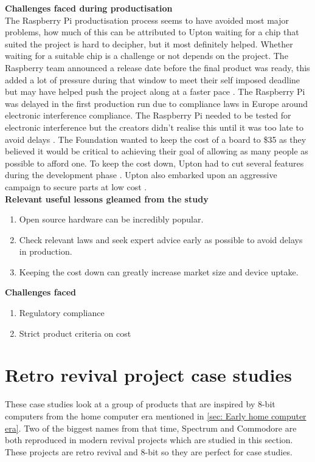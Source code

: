 \textbf{Challenges faced during productisation}\\
The Raspberry Pi productisation process seems to have avoided most major problems, how much of this can be attributed to Upton waiting for a chip that suited the project is hard to decipher, but it most definitely helped. Whether waiting for a suitable chip is a challenge or not depends on the project.
The Raspberry team announced a release date before the final product was ready, this added a lot of pressure during that window to meet their self imposed deadline but may have helped push the project along at a faster pace 
\cite{RN97}. 
The Raspberry Pi was delayed in the first production run due to compliance laws in Europe around electronic interference compliance. The Raspberry Pi needed to be tested for electronic interference but the creators didn't realise this until it was too late to avoid delays 
\cite{RN98}. The Foundation wanted to keep the cost of a board to \$35 as they believed it would be critical to achieving their goal of allowing as many people as possible to afford one. To keep the cost down, Upton had to cut several features during the development phase 
\cite{RN98}. Upton also embarked upon an aggressive campaign to secure parts at low cost 
\cite{RN98}.\\

\textbf{Relevant useful lessons gleamed from the study}
\begin{enumerate}
\item Open source hardware can be incredibly popular. 
\item Check relevant laws and seek expert advice early as possible to avoid delays in production.
\item Keeping the cost down can greatly increase market size and device uptake. \\
\end{enumerate}

\textbf{Challenges faced}
\begin{enumerate}
\item Regulatory compliance
\item Strict product criteria on cost
\end{enumerate}

\section{Retro revival project case studies}
These case studies look at a group of products that are inspired by 8-bit computers from the home computer era mentioned in \ref{sec: Early home computer era}. Two of the biggest names from that time, Spectrum and Commodore are both reproduced in modern revival projects which are studied in this section. These projects are retro revival and 8-bit so they are perfect for case studies.

